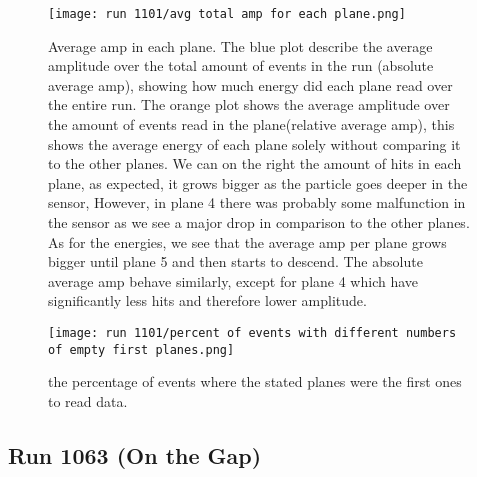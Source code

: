 \documentclass[11pt]{article}
\begin{document}
\begin{figure}[h]
    \centering  \texttt{[image: run 1101/avg total amp for each plane.png]}
    \caption{Average amp in each plane. The blue plot describe the average amplitude over the total amount of events in the run (absolute average amp), showing how much energy did each plane read over the entire run. The orange plot shows the average amplitude over the amount of events read in the plane(relative average amp), this shows the average energy of each plane solely without comparing it to the other planes. We can on the right the amount of hits in each plane, as expected, it grows bigger as the particle goes deeper in the sensor, However, in plane 4 there was probably some malfunction in the sensor as we see a major drop in comparison to the other planes. As for the energies, we see that the average amp per plane grows bigger until plane 5 and then starts to descend. The absolute average amp behave similarly, except for plane 4 which have significantly less hits and therefore lower amplitude.}
    \label{avg amp per plane run 1101}
\end{figure}




\begin{figure}[h]
    \centering  \texttt{[image: run 1101/percent of events with different numbers of empty first planes.png]}
    \caption{the percentage of events where the stated planes were the first ones to read data.}
    \label{empty first planes run 1101}
\end{figure}













































\newpage
\subsection{Run 1063 (On the Gap)}
\end{document}

